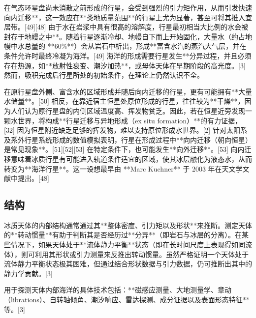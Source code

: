 在气态环星盘尚未消散之前形成的行星，会受到强烈的引力矩作用，从而引发快速向内迁移**，这一效应在**类地质量范围**的行星上尤为显著，甚至可将其推入宜居带。[49][48] 由于水在岩浆中具有很高的溶解度，行星最初相当大比例的水会被封存于地幔之中**。随着行星逐渐冷却、地幔自下而上开始固化，大量水（约占地幔中水总量的 **60\%**）会从岩石中析出，形成**富含水汽的蒸汽大气层，并在条件允许时最终冷凝为海洋。[49] 海洋的形成需要行星发生**分异过程，并且必须存在热源，如**放射性衰变、潮汐加热**，或母体天体在早期阶段的高光度。[3] 然而，吸积完成后行星所处的初始条件，在理论上仍然认识不全。

在原行星盘外侧、富含水的区域形成并随后向内迁移的行星，更有可能拥有**大量水储量**。[50] 相反，在靠近宿主恒星处原位形成的行星，往往较为**干燥**，因为人们认为原行星盘的内侧区域温度高、挥发物贫乏。因此，若在恒星近旁发现一颗水世界，将构成**行星迁移与异地形成（ex situ formation）**的有力证据，[32] 因为恒星附近缺乏足够的挥发物，难以支持原位形成水世界。[2] 针对太阳系及系外行星系统形成的数值模拟表明，行星在形成过程中**向内迁移（朝向恒星）是常见现象**。[51][52][53] 在特定条件下，也可能发生**向外迁移**。[53] 向内迁移意味着冰质行星有可能进入轨道条件适宜的区域，使其冰层融化为液态水，从而转变为**海洋行星**。这一设想最早由 **Marc Kuchner** 于 2003 年在天文学文献中提出。[48]
\subsection{结构}
冰质天体的内部结构通常通过其**整体密度、引力矩以及形状**来推断。测定天体的**转动惯量**有助于判断其是否经历过**分异**（即岩石与冰层的分离）。在某些情况下，如果天体处于**流体静力平衡**状态（即在长时间尺度上表现得如同流体），则可利用其形状或引力测量来反推出转动惯量。虽然严格证明一个天体处于流体静力平衡状态极其困难，但通过结合形状数据与引力数据，仍可推断出其中的静力学贡献。[3]

用于探测天体内部海洋的具体技术包括：**磁感应测量、大地测量学、章动（librations）、自转轴倾角、潮汐响应、雷达探测、成分证据以及表面形态特征**等。[3]
